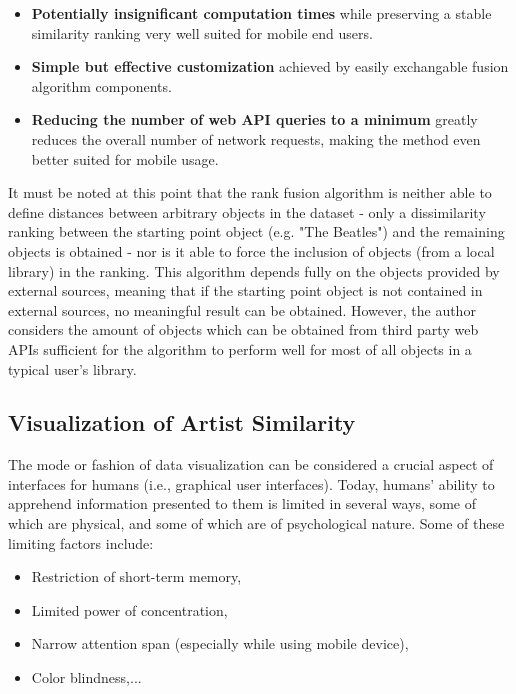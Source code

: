 \begin{itemize}
	\item \textbf{Potentially insignificant computation times} while preserving a stable similarity ranking very well suited for mobile end users.
	\item \textbf{Simple but effective customization} achieved by easily exchangable fusion algorithm components.
	\item \textbf{Reducing the number of web API queries to a minimum} greatly reduces the overall number of network requests, making the method even better suited for mobile usage.
\end{itemize}

It must be noted at this point that the rank fusion algorithm is neither able to define distances between arbitrary objects in the dataset - only a dissimilarity ranking between the starting point object (e.g. "The Beatles") and the remaining objects is obtained - nor is it able to force the inclusion of objects (from a local library) in the ranking. This algorithm depends fully on the objects provided by external sources, meaning that if the starting point object is not contained in external sources, no meaningful result can be obtained. However, the author considers the amount of objects which can be obtained from third party web APIs sufficient for the algorithm to perform well for most of all objects in a typical user's library.

\subsection{Visualization of Artist Similarity}

The mode or fashion of data visualization can be considered a crucial aspect of interfaces for humans (i.e., graphical user interfaces). Today, humans' ability to apprehend information presented to them is limited in several ways, some of which are physical, and some of which are of psychological nature. Some of these limiting factors include:

\begin{itemize}
	\item Restriction of short-term memory,
	\item Limited power of concentration,
	\item Narrow attention span (especially while using mobile device),
	\item Color blindness,...
\end{itemize}


